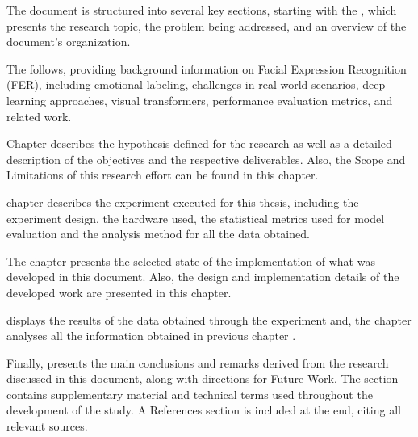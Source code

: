 The document is structured into several key sections, starting with the
, which presents the research topic, the problem being addressed, and an overview of the document’s organization. 

The  follows,
providing background information on Facial Expression Recognition (FER), including emotional labeling, challenges in real-world scenarios, deep learning approaches, visual transformers, performance evaluation metrics, and related work. 


Chapter  describes the hypothesis defined for the research as well as a detailed description of the objectives and the respective deliverables. Also, the Scope and Limitations of this research effort can be found in this chapter.
%

 chapter describes the experiment executed for this thesis, including the experiment design, the hardware used, the statistical metrics used for model evaluation and the analysis method for all the data obtained.

The  chapter presents the selected state of the implementation of what was developed in this document. Also, the design and implementation details of the developed work are presented in this chapter. 


 displays the results of the data obtained through the experiment and, the   chapter analyses all the information obtained in previous chapter .

 
Finally,  presents the main conclusions and remarks derived from the research discussed in this document, along with directions for Future Work. The section  contains supplementary material and technical terms used throughout the development of the study. A References section is included at the end, citing all relevant sources.

